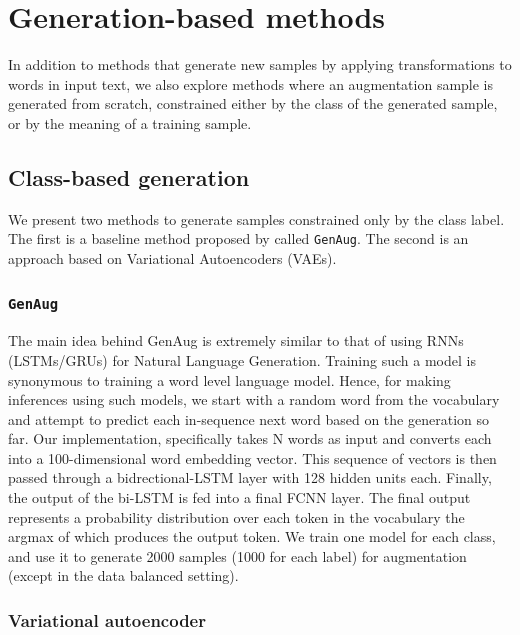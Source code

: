 \documentclass[11pt,a4paper]{article}
\begin{document}
\section{Generation-based methods}
In addition to methods that generate new samples by applying transformations to words in input text, we also explore methods where an augmentation sample is generated from scratch, constrained either by the class of the generated sample, or by the meaning of a training sample.

\subsection{Class-based generation}
We present two methods to generate samples constrained only by the class label. The first is a baseline method proposed by \citet{aug2prev} called \texttt{GenAug}. The second is an approach based on Variational Autoencoders (VAEs).

\subsubsection{\texttt{GenAug}}
The main idea behind GenAug is extremely similar to that of using RNNs (LSTMs/GRUs) for Natural Language Generation. Training such a model is synonymous to training a word level language model. Hence, for making inferences using such models, we start with a random word from the vocabulary and attempt to predict each in-sequence next word based on the generation so far. Our implementation, specifically takes N words as input and converts each into a 100-dimensional word embedding vector. This sequence of vectors is then passed through a bidrectional-LSTM layer with 128 hidden units each. Finally, the output of the bi-LSTM is fed into a final FCNN layer. The final output represents a probability distribution over each token in the vocabulary the argmax of which produces the output token. We train one model for each class, and use it to generate 2000 samples (1000 for each label) for augmentation (except in the data balanced setting).

\subsubsection{Variational autoencoder}
\end{document}
